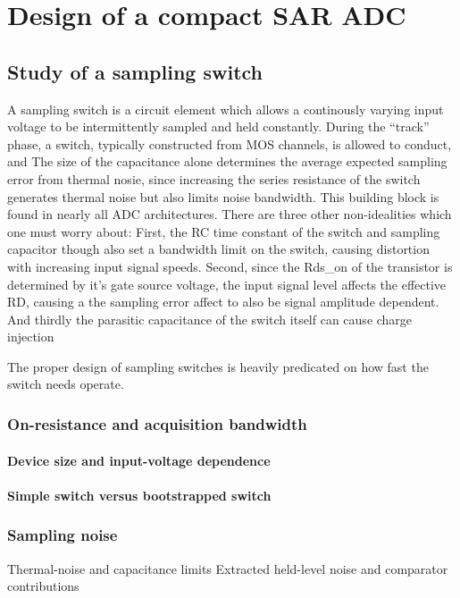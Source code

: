 \documentclass[PhD, UKenglish]{scrbook}
\begin{document}
\chapter{Design of a compact SAR ADC}

\section{Study of a sampling switch}

A sampling switch is a circuit element which allows a continously varying input voltage to be intermittently sampled and held constantly.
During the ``track'' phase, a switch, typically constructed from MOS channels, is allowed to conduct, and
The size of the capacitance alone determines the average expected sampling error from thermal nosie, since increasing the series resistance of the switch generates thermal noise but also limits noise bandwidth.
This building block is found in nearly all ADC architectures.
There are three other non-idealities which one must worry about:
First, the RC time constant of the switch and sampling capacitor though also set a bandwidth limit on the switch, causing distortion with increasing input signal speeds.
Second, since the Rds_on of the transistor is determined by it's gate source voltage, the input signal level affects the effective RD, causing a the sampling error affect to also be signal amplitude dependent.
And thirdly the parasitic capacitance of the switch itself can cause charge injection

The proper design of sampling switches is heavily predicated on how fast the switch needs operate.

\subsection{On-resistance and acquisition bandwidth}
\subsubsection{Device size and input-voltage dependence}
\subsubsection{Simple switch versus bootstrapped switch}
\subsection{Sampling noise}
Thermal-noise and capacitance limits
Extracted held-level noise and comparator contributions
\end{document}
